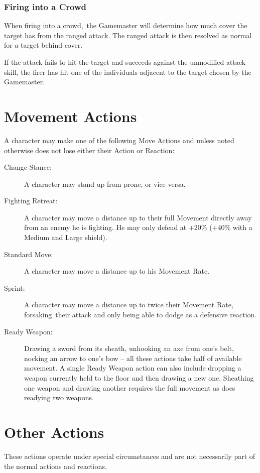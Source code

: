 \subsubsection{Firing into a Crowd}
When firing into a crowd, the Gamemaster will determine how much cover the target has from the ranged attack. The ranged attack is then resolved as normal for a target behind cover. 

If the attack fails to hit the target and succeeds against the unmodified attack skill, the firer has hit one of the individuals adjacent to the target chosen by the Gamemaster. 


\section{Movement Actions}
A character may make one of the following Move Actions and unless noted otherwise does not lose either their Action or Reaction:

\begin{description}
\item[Change Stance:] A character may stand up from prone, or vice versa.
\item[Fighting Retreat:] A character may move a distance up to their full Movement directly away from an enemy he is fighting. He may only defend at +20\% (+40\% with a Medium and Large shield).
\item[Standard Move:] A character may move a distance up to his Movement Rate.
\item[Sprint:] A character may move a distance up to twice their Movement Rate, forsaking their attack and only being able to dodge as a defensive reaction.
\item[Ready Weapon:] Drawing a sword from its sheath, unhooking an axe from one’s belt, nocking an arrow to one’s bow – all these actions take half of available movement. A single Ready Weapon action can also include dropping a weapon currently held to the floor and then drawing a new one. Sheathing one weapon and drawing another requires the full movement as does readying two weapons. 
\end{description}


\section{Other Actions}
These actions operate under special circumstances and are not necessarily part of the normal actions and reactions.

